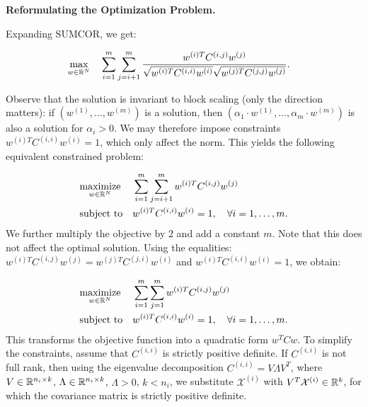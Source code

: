 \noindent\textbf{Reformulating the Optimization Problem.}
\begin{sloppypar}
Expanding SUMCOR, we get:

\begin{equation*}
\begin{aligned}
& \underset{w \in \mathbb{R}^N}{\text{max}} & & \sum_{i = 1}^m
  \sum_{j = i+1}^m \frac{w^{(i)T} C^{(i,j)}
    w^{(j)}}{\sqrt{w^{(i)T} C^{(i,i)} w^{(i)}} \sqrt{w^{(j)T}
      C^{(j,j)} w^{(j)}}}.
\end{aligned}
\end{equation*}

Observe that the solution is invariant to block scaling (only the direction matters):
if $\left(w^{(1)}, \ldots, w^{(m)}\right)$ is a solution, then
$\left(\alpha_1 \cdot w^{(1)}, \ldots, \alpha_m \cdot w^{(m)}\right)$ is also a
solution for $\alpha_i > 0$. We may therefore impose constraints $w^{(i)T}C^{(i,i)}w^{(i)} = 1$,
which only affect the norm.
This yields the following  equivalent constrained problem:
\end{sloppypar}
\begin{equation}\label{eq:qcqp0}
\begin{aligned}
& \underset{w \in \mathbb{R}^N}{\text{maximize}}
& & \sum_{i = 1}^m \sum_{j = i+1}^m w^{(i)T} C^{(i,j)} w^{(j)}\\
& \text{subject to}
& &w^{(i)T} C^{(i,i)} w^{(i)} = 1, \quad\forall i = 1,\ldots, m.
\end{aligned}
\end{equation}
We further multiply the objective by $2$ and add a constant $m$. Note that this does not
affect the optimal solution. Using the equalities: $w^{(i)T} C^{(i,j)} w^{(j)} = w^{(j)T} C^{(j,i)} w^{(i)}$
and $w^{(i)T} C^{(i,i)} w^{(i)} = 1$, we obtain:

\begin{equation}\label{eq:qcqp05}
\begin{aligned}
& \underset{w \in \mathbb{R}^N}{\text{maximize}}
& & \sum_{i = 1}^m \sum_{j = 1}^m w^{(i)T} C^{(i,j)} w^{(j)}\\
& \text{subject to}
& &w^{(i)T} C^{(i,i)} w^{(i)} = 1, \quad\forall i = 1,\ldots, m.
\end{aligned}
\end{equation}
This transforms the objective function into a quadratic form $w^T C w$. To
simplify the constraints, assume that $C^{(i,i)}$ is strictly positive definite.
If $C^{(i,i)}$ is not full rank, then using the eigenvalue decomposition
$C^{(i,i)} = V \Lambda V^T$, where $V \in \mathbb{R}^{n_i \times k}$,
$\Lambda \in \mathbb{R}^{n_i \times k}$, $\Lambda > 0$, $k < n_i$,
we substitute $\mathcal{X}^{(i)}$ with $V^T \mathcal{X}^{(i)} \in \mathbb{R}^k$,
for which the covariance matrix is strictly positive definite.

